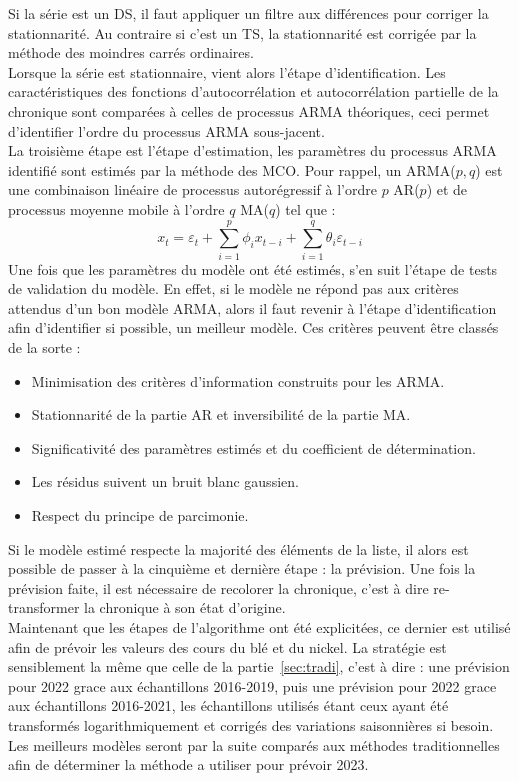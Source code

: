 Si la série est un DS, il faut appliquer un filtre aux différences pour corriger la stationnarité. Au contraire si c'est un TS, la stationnarité est corrigée par la 
méthode des moindres carrés ordinaires.\\[11pt]
Lorsque la série est stationnaire, vient alors l'étape d'identification. Les caractéristiques des fonctions d'autocorrélation et autocorrélation partielle de la chronique
sont comparées à celles de processus ARMA théoriques, ceci permet d'identifier l'ordre du processus ARMA sous-jacent.\\[11pt]
La troisième étape est l'étape d'estimation, les paramètres du processus ARMA identifié sont estimés par la méthode des MCO. Pour rappel, un ARMA($p,q$) est une 
combinaison linéaire de processus autorégressif à l'ordre $p$ AR($p$) et de processus moyenne mobile à l'ordre $q$ MA($q$) tel que :
\begin{equation*}
    x_t = \varepsilon_t +  \sum_{i=1}^p \phi_i x_{t-i} + \sum_{i=1}^q \theta_i \varepsilon_{t-i}
\end{equation*}
Une fois que les paramètres du modèle ont été estimés, s'en suit l'étape de tests de validation du modèle. En effet, si le modèle ne répond pas aux critères attendus 
d'un bon modèle ARMA, alors il faut revenir à l'étape d'identification afin d'identifier si possible, un meilleur modèle. Ces critères peuvent être classés de la sorte :
\begin{itemize}
    \item Minimisation des critères d'information construits pour les ARMA.
    \item Stationnarité de la partie AR et inversibilité de la partie MA.
    \item Significativité des paramètres estimés et du coefficient de détermination.
    \item Les résidus suivent un bruit blanc gaussien.
    \item Respect du principe de parcimonie.
\end{itemize}
Si le modèle estimé respecte la majorité des éléments de la liste, il alors est possible de passer à la cinquième et dernière étape : la prévision. Une fois la prévision
faite, il est nécessaire de recolorer la chronique, c'est à dire re-transformer la chronique à son état d'origine.\\[11pt]
Maintenant que les étapes de l'algorithme ont été explicitées, ce dernier est utilisé afin de prévoir les valeurs des cours du blé et du nickel. La stratégie est 
sensiblement la même que celle de la partie~\ref{sec:tradi}, c'est à dire : une prévision pour 2022 grace aux échantillons 2016-2019, puis une prévision pour 2022 grace 
aux échantillons 2016-2021, les échantillons utilisés étant ceux ayant été transformés logarithmiquement et corrigés des variations saisonnières si besoin. Les meilleurs 
modèles seront par la suite comparés aux méthodes traditionnelles afin de déterminer la méthode a utiliser pour prévoir 2023.
